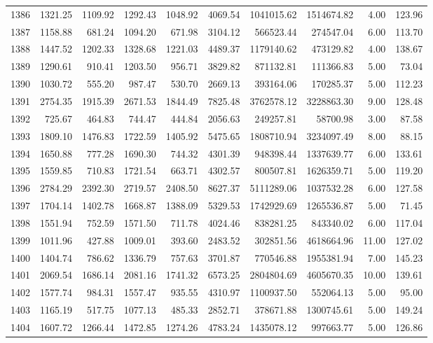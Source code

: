 \begin{tabular}{lrrrrrrrrr}
1386 & 1321.25 & 1109.92 & 1292.43 & 1048.92 & 4069.54 & 1041015.62 & 1514674.82 & 4.00 & 123.96 \\
1387 & 1158.88 & 681.24 & 1094.20 & 671.98 & 3104.12 & 566523.44 & 274547.04 & 6.00 & 113.70 \\
1388 & 1447.52 & 1202.33 & 1328.68 & 1221.03 & 4489.37 & 1179140.62 & 473129.82 & 4.00 & 138.67 \\
1389 & 1290.61 & 910.41 & 1203.50 & 956.71 & 3829.82 & 871132.81 & 111366.83 & 5.00 & 73.04 \\
1390 & 1030.72 & 555.20 & 987.47 & 530.70 & 2669.13 & 393164.06 & 170285.37 & 5.00 & 112.23 \\
1391 & 2754.35 & 1915.39 & 2671.53 & 1844.49 & 7825.48 & 3762578.12 & 3228863.30 & 9.00 & 128.48 \\
1392 & 725.67 & 464.83 & 744.47 & 444.84 & 2056.63 & 249257.81 & 58700.98 & 3.00 & 87.58 \\
1393 & 1809.10 & 1476.83 & 1722.59 & 1405.92 & 5475.65 & 1808710.94 & 3234097.49 & 8.00 & 88.15 \\
1394 & 1650.88 & 777.28 & 1690.30 & 744.32 & 4301.39 & 948398.44 & 1337639.77 & 6.00 & 133.61 \\
1395 & 1559.85 & 710.83 & 1721.54 & 663.71 & 4302.57 & 800507.81 & 1626359.71 & 5.00 & 119.20 \\
1396 & 2784.29 & 2392.30 & 2719.57 & 2408.50 & 8627.37 & 5111289.06 & 1037532.28 & 6.00 & 127.58 \\
1397 & 1704.14 & 1402.78 & 1668.87 & 1388.09 & 5329.53 & 1742929.69 & 1265536.87 & 5.00 & 71.45 \\
1398 & 1551.94 & 752.59 & 1571.50 & 711.78 & 4024.46 & 838281.25 & 843340.02 & 6.00 & 117.04 \\
1399 & 1011.96 & 427.88 & 1009.01 & 393.60 & 2483.52 & 302851.56 & 4618664.96 & 11.00 & 127.02 \\
1400 & 1404.74 & 786.62 & 1336.79 & 757.63 & 3701.87 & 770546.88 & 1955381.94 & 7.00 & 145.23 \\
1401 & 2069.54 & 1686.14 & 2081.16 & 1741.32 & 6573.25 & 2804804.69 & 4605670.35 & 10.00 & 139.61 \\
1402 & 1577.74 & 984.31 & 1557.47 & 935.55 & 4310.97 & 1100937.50 & 552064.13 & 5.00 & 95.00 \\
1403 & 1165.19 & 517.75 & 1077.13 & 485.33 & 2852.71 & 378671.88 & 1300745.61 & 5.00 & 149.24 \\
1404 & 1607.72 & 1266.44 & 1472.85 & 1274.26 & 4783.24 & 1435078.12 & 997663.77 & 5.00 & 126.86 \\

\end{tabular}
